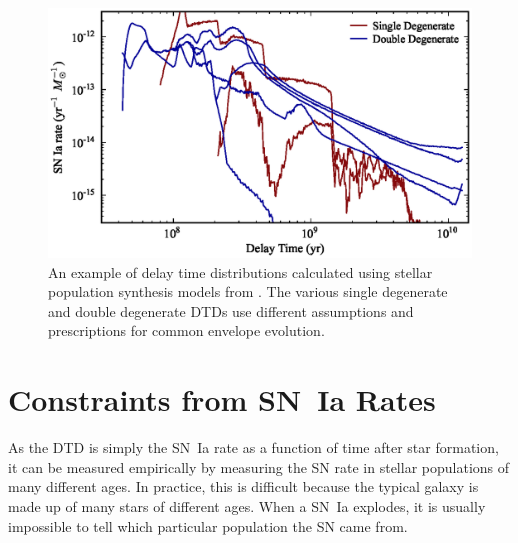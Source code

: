 \begin{figure}[tbh]
\begin{center}
\includegraphics[width=\textwidth]{figures/review/dtd_mennekens10a.eps}
\end{center}
\caption[Example of delay time distributions]{An example of delay time
  distributions calculated using stellar population synthesis models
  from \citet{mennekens10a}. The various single degenerate and double
  degenerate DTDs use different assumptions and prescriptions for
  common envelope evolution.\label{fig:dtd_mennekens10a}}
\end{figure}

\section{Constraints from SN~Ia Rates}

As the DTD is simply the SN~Ia rate as a function of time after star
formation, it can be measured empirically by measuring the SN rate in
stellar populations of many different ages. In practice, this is
difficult because the typical galaxy is made up of many stars of
different ages. When a SN~Ia explodes, it is usually impossible to
tell which particular population the SN came from.

